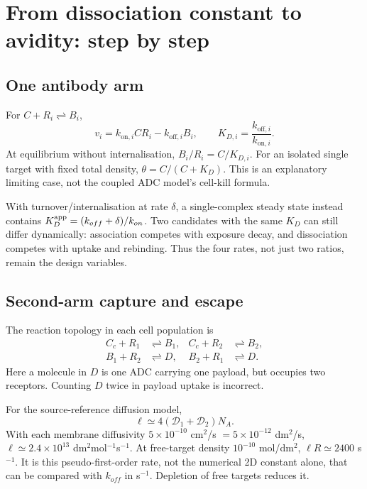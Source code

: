 \documentclass[11pt,a4paper]{article}
\begin{document}
\section{From dissociation constant to avidity: step by step}
\subsection{One antibody arm}
For $C+R_i\rightleftharpoons B_i$,
\begin{equation}
 v_i=k_{\mathrm{on},i}C R_i-k_{\mathrm{off},i}B_i,
 \qquad K_{D,i}=\frac{k_{\mathrm{off},i}}{k_{\mathrm{on},i}}.
\end{equation}
At equilibrium without internalisation, $B_i/R_i=C/K_{D,i}$. For an isolated single target with fixed total density, $\theta=C/(C+K_D)$. This is an explanatory limiting case, not the coupled ADC model's cell-kill formula.

With turnover/internalisation at rate $\delta$, a single-complex steady state instead contains $K_D^{\rm app}=(k_{off}+\delta)/k_{on}$. Two candidates with the same $K_D$ can still differ dynamically: association competes with exposure decay, and dissociation competes with uptake and rebinding. Thus the four rates, not just two ratios, remain the design variables.

\subsection{Second-arm capture and escape}
The reaction topology in each cell population is
\begin{align}
 C_c+R_1&\rightleftharpoons B_1,& C_c+R_2&\rightleftharpoons B_2,\\
 B_1+R_2&\rightleftharpoons D,&B_2+R_1&\rightleftharpoons D.
\end{align}
Here a molecule in $D$ is one ADC carrying one payload, but occupies two receptors. Counting $D$ twice in payload uptake is incorrect.

For the source-reference diffusion model,
\begin{equation}
 \ell\simeq4(\mathcal D_1+\mathcal D_2)N_A.
\end{equation}
With each membrane diffusivity $5\times10^{-10}$ cm$^2$/s $=5\times10^{-12}$ dm$^2$/s, $\ell\simeq2.4\times10^{13}$ dm$^2$mol$^{-1}$s$^{-1}$. At free-target density $10^{-10}$ mol/dm$^2$, $\ell R\simeq2400$ s$^{-1}$. It is this pseudo-first-order rate, not the numerical 2D constant alone, that can be compared with $k_{off}$ in s$^{-1}$. Depletion of free targets reduces it.
\end{document}
